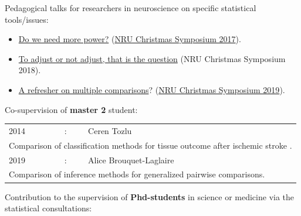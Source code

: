 \documentclass[12pt]{article}
\begin{document}
\clearpage

Pedagogical talks for researchers in neuroscience on specific
statistical tools/issues:
\begin{itemize}
\item \href{https://bozenne.github.io/doc/Talks/2017-XNRU-power.pdf}{Do we need more power?} (\href{https://www.nru.dk/images/News/NeurobiologyResearchUnit-Christmas-symposium2017.pdf}{NRU Christmas Symposium 2017}).
\item \href{https://bozenne.github.io/doc/Talks/2018-XNRU-DAGs.pdf}{To adjust or not adjust, that is the question} (NRU Christmas Symposium 2018).
\item \href{https://bozenne.github.io/doc/Talks/2019-XNRU-multcomp.pdf}{A refresher on multiple comparisons}? (\href{https://nru.dk/index.php/news-menu/279-nru-christimas-symposium-2019}{NRU Christmas Symposium 2019}).
\end{itemize}

\bigskip

Co-supervision of \textbf{master 2} student: 

\medskip

\begin{tabular}{l@{ }l@{ }l}
2014 &:& Ceren Tozlu \\
\multicolumn{3}{l}{Comparison of classification methods for tissue outcome after ischemic stroke \citep{tozlu2019comparison}.} \\ [3mm]
2019 &:& Alice Brouquet-Laglaire \\
\multicolumn{3}{l}{Comparison of inference methods for generalized pairwise comparisons.} \\ [3mm]
\end{tabular}

\bigskip

Contribution to the supervision of \textbf{Phd-students} in science or
medicine via the statistical consultations:

\medskip
\end{document}
